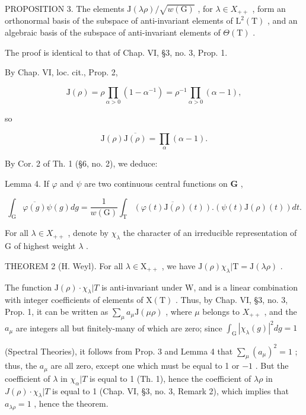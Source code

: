 PROPOSITION 3. The elements \(\mathrm{J}(\lambda\rho)/\sqrt{w(\mathrm{G})}\) , for \(\lambda\in X_{++}\) , form an orthonormal basis of the subspace of anti-invariant elements of \(\mathrm{L}^{2}(\mathrm{T})\) , and an algebraic basis of the subspace of anti-invariant elements of \(\Theta(\mathrm{T})\) .

The proof is identical to that of Chap. VI, §3, no. 3, Prop. 1.

By Chap. VI, loc. cit., Prop. 2,

\[
\mathrm{J} (\rho) = \rho \prod_ {\alpha > 0} (1 - \alpha^ {- 1}) = \rho^ {- 1} \prod_ {\alpha > 0} (\alpha - 1),\tag{3}
\]

so

\[
\mathrm{J} (\rho) \overline {{\mathrm{J} (\rho)}} = \prod_ {\alpha} (\alpha - 1).\tag{4}
\]

By Cor. 2 of Th. 1 (§6, no. 2), we deduce:

Lemma 4. If \(\varphi\) and \(\psi\) are two continuous central functions on \(\mathbf{G}\) ,

\[
\int_ {\mathrm{G}} \overline {{\varphi (g)}} \psi (g) d g = \frac {1}{w (\mathrm{G})} \int_ {\mathrm{T}} \overline {{(\varphi (t) \mathrm{J} (\rho) (t))}}. (\psi (t) \mathrm{J} (\rho) (t)) d t.
\]

For all \(\lambda\in X_{++}\) , denote by \(\chi_{\lambda}\) the character of an irreducible representation of G of highest weight \(\lambda\) .

THEOREM 2 (H. Weyl). For all \(\lambda \in \mathrm{X}_{++}\) , we have \(\mathrm{J}(\rho)\chi_{\lambda}|\mathrm{T} = \mathrm{J}(\lambda \rho)\) .

The function \(\mathrm{J}(\rho)\cdot\chi_{\lambda}|T\) is anti-invariant under W, and is a linear combination with integer coefficients of elements of \(\mathrm{X(T)}\) . Thus, by Chap. VI, §3, no. 3, Prop. 1, it can be written as \(\sum_{\mu}a_{\mu}\mathrm{J}(\mu\rho)\) , where \(\mu\) belongs to \(X_{++}\) , and the \(a_{\mu}\) are integers all but finitely-many of which are zero; since \(\int_{\mathrm{G}}|\chi_{\lambda}(g)|^{2}dg=1\)

(Spectral Theories), it follows from Prop. 3 and Lemma 4 that \(\sum_{\mu}(a_{\mu})^{2} = 1\) ; thus, the \(a_{\mu}\) are all zero, except one which must be equal to 1 or \(-1\) . But the coefficient of \(\lambda\) in \(\chi_{\alpha}|T\) is equal to 1 (Th. 1), hence the coefficient of \(\lambda \rho\) in \(J(\rho)\cdot \chi_{\lambda}|T\) is equal to 1 (Chap. VI, §3, no. 3, Remark 2), which implies that \(a_{\lambda \rho} = 1\) , hence the theorem.

